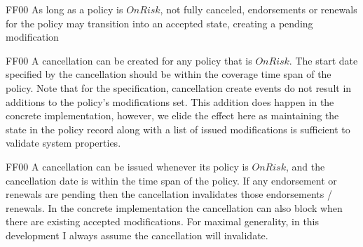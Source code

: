 \@pvspace{8.0pt}%
\@x{}\midbar\@xx{}%
\begin{lcom}{7.5}%
\begin{cpar}{0}{F}{F}{0}{0}{}%
 As long as a policy is \ensuremath{OnRisk}, not fully canceled, endorsements
 or renewals for the
 policy may transition into an accepted state, creating a pending modification
\end{cpar}%
\end{lcom}%
%
%
%
%
\@pvspace{8.0pt}%
\begin{lcom}{7.5}%
\begin{cpar}{0}{F}{F}{0}{0}{}%
 A cancellation can be created for any policy that is \ensuremath{OnRisk}. The
 start date specified by
 the cancellation should be within the coverage time span of the policy.
 Note that for the specification, cancellation create events do not result in
 additions
 to the policy\mbox{'}s modifications set. This addition does happen in the
 concrete
 implementation, however, we elide the effect here as maintaining the state
 in the policy
 record along with a list of issued modifications is sufficient to validate
 system
 properties.
\end{cpar}%
\end{lcom}%
%
%
%
%
\@xx{}%
%
\@pvspace{8.0pt}%
\begin{lcom}{7.5}%
\begin{cpar}{0}{F}{F}{0}{0}{}%
 A cancellation can be issued whenever its policy is \ensuremath{OnRisk}, and
 the cancellation date
 is within the time span of the policy. If any endorsement or renewals are
 pending then
 the cancellation invalidates those endorsements / renewals. In the concrete
 implementation
 the cancellation can also block when there are existing accepted
 modifications. For maximal
 generality, in this development I always assume the cancellation will
 invalidate.
\end{cpar}%
\end{lcom}%
